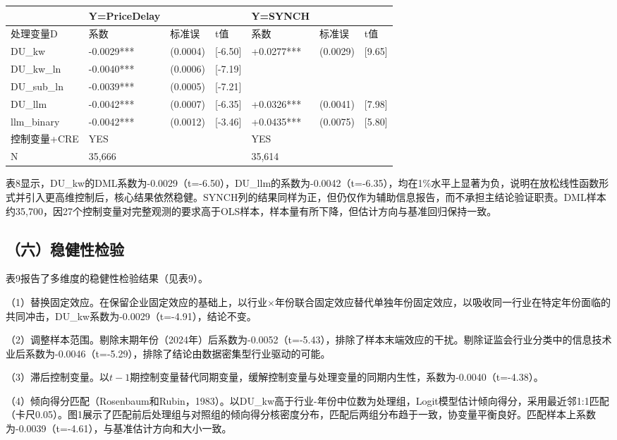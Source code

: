 {\def\LTcaptype{} %
\begin{longtable}[]{@{}lllllll@{}}
\toprule\noalign{}
& Y=PriceDelay & & & Y=SYNCH & & \\
\midrule\noalign{}
\endhead
\bottomrule\noalign{}
\endlastfoot
处理变量D & 系数 & 标准误 & t值 & 系数 & 标准误 & t值 \\
DU\_kw & -0.0029*** & (0.0004) & {[}-6.50{]} & +0.0277*** & (0.0029) & {[}9.65{]} \\
DU\_kw\_ln & -0.0040*** & (0.0006) & {[}-7.19{]} & & & \\
DU\_sub\_ln & -0.0039*** & (0.0005) & {[}-7.21{]} & & & \\
DU\_llm & -0.0042*** & (0.0007) & {[}-6.35{]} & +0.0326*** & (0.0041) & {[}7.98{]} \\
llm\_binary & -0.0042*** & (0.0012) & {[}-3.46{]} & +0.0435*** & (0.0075) & {[}5.80{]} \\
控制变量+CRE & YES & & & YES & & \\
N & 35,666 & & & 35,614 & & \\
\end{longtable}
}

表8显示，DU\_kw的DML系数为-0.0029（t=-6.50），DU\_llm的系数为-0.0042（t=-6.35），均在1\%水平上显著为负，说明在放松线性函数形式并引入更高维控制后，核心结果依然稳健。SYNCH列的结果同样为正，但仍仅作为辅助信息报告，而不承担主结论验证职责。DML样本约35,700，因27个控制变量对完整观测的要求高于OLS样本，样本量有所下降，但估计方向与基准回归保持一致。

\subsection{（六）稳健性检验}\label{ux516dux7a33ux5065ux6027ux68c0ux9a8c}

表9报告了多维度的稳健性检验结果（见表9）。

（1）替换固定效应。在保留企业固定效应的基础上，以行业×年份联合固定效应替代单独年份固定效应，以吸收同一行业在特定年份面临的共同冲击，DU\_kw系数为-0.0029（t=-4.91），结论不变。

（2）调整样本范围。剔除末期年份（2024年）后系数为-0.0052（t=-5.43），排除了样本末端效应的干扰。剔除证监会行业分类中的信息技术业后系数为-0.0046（t=-5.29），排除了结论由数据密集型行业驱动的可能。

（3）滞后控制变量。以\(t-1\)期控制变量替代同期变量，缓解控制变量与处理变量的同期内生性，系数为-0.0040（t=-4.38）。

（4）倾向得分匹配（Rosenbaum和Rubin，1983）。以DU\_kw高于行业-年份中位数为处理组，Logit模型估计倾向得分，采用最近邻1:1匹配（卡尺0.05）。图1展示了匹配前后处理组与对照组的倾向得分核密度分布，匹配后两组分布趋于一致，协变量平衡良好。匹配样本上系数为-0.0039（t=-4.61），与基准估计方向和大小一致。

